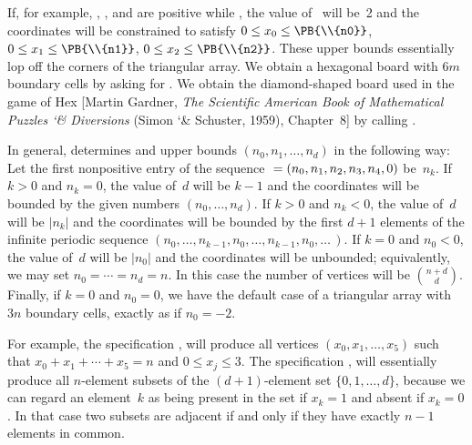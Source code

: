If, for example, , , and  are positive while %
, the
value of~ will be~2 and the coordinates will be constrained to
satisfy $0\le x_0\le\PB{\\{n0}}$, $0\le x_1\le\PB{\\{n1}}$, $0\le x_2\le\PB{%
\\{n2}}$. These
upper bounds essentially lop off the corners of the triangular array.
We obtain a hexagonal board with $6m$ boundary cells by asking for
. We
obtain the diamond-shaped board used
in the game of Hex [Martin Gardner, {\sl The Scientific American
Book of Mathematical Puzzles {\char`\&} Diversions\/} (Simon {\char`\&}
Schuster, 1959), Chapter~8] by calling .

In general,  determines  and upper bounds $(n_0,n_1,%
\ldots,n_d)$
in the following way: Let the first nonpositive entry of the sequence
$%
\null=(n_0,n_1,n_2,n_3,n_4,0)$ be~$n_k$. If $k>0$
and $n_k=0$, the value of~$d$ will be $k-1$ and the coordinates will be
bounded by the given numbers $(n_0,\ldots,n_d)$. If $k>0$ and $n_k<0$,
the value of~$d$ will be $\vert n_k\vert$ and the coordinates will be
bounded by the first $d+1$ elements of the infinite periodic sequence
$(n_0,\ldots,n_{k-1},n_0,\ldots,n_{k-1},n_0,\ldots\,)$. If $k=0$ and
$n_0<0$, the value of~$d$ will be $\vert n_0\vert$ and the coordinates
will be unbounded; equivalently, we may set $n_0=\cdots=n_d=n$. In
this case the number of vertices will be $n+d\choose d$. Finally,
if $k=0$ and $n_0=0$, we have the default case of a triangular array
with $3n$ boundary cells, exactly as if $n_0=-2$.

For example, the specification , 
will produce all vertices
$(x_0,x_1,\ldots,x_5)$ such that $x_0+x_1+\cdots+x_5=n$ and $0\le x_j\le3$.
The specification ,  will essentially
produce all $n$-element
subsets of the $(d+1)$-element set $\{0,1,\ldots,d\}$, because we can
regard an element~$k$ as being present in the set if $x_k=1$ and absent
if $x_k=0$. In that case two subsets are adjacent if and only if
they have exactly $n-1$ elements in common.

